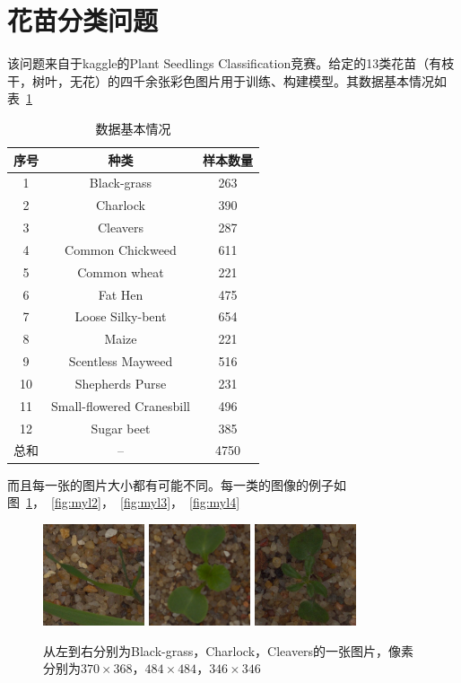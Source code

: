 \section{花苗分类问题}
该问题来自于kaggle的Plant Seedlings Classification竞赛。给定的13类花苗（有枝干，树叶，无花）的四千余张彩色图片用于训练、构建模型。其数据基本情况如表~\ref{table:sjjb}

\begin{table}[htbp]
\centering
\caption{数据基本情况}
\begin{tabular}{ccc}
\toprule[2pt]
序号 & 种类 & 样本数量 \\ 
\midrule[1pt]
1 & Black-grass & 263 \\ 
2 & Charlock & 390 \\ 
3 & Cleavers & 287 \\ 
4 & Common Chickweed & 611 \\ 
5 & Common wheat & 221 \\ 
6 & Fat Hen & 475 \\ 
7 & Loose Silky-bent & 654 \\ 
8 & Maize & 221 \\  
9 & Scentless Mayweed & 516 \\ 
10 & Shepherds Purse & 231 \\ 
11 & Small-flowered Cranesbill & 496 \\ 
12 & Sugar beet & 385 \\ 
\midrule[1pt]
总和 & -- & 4750\\
\bottomrule[2pt]
\end{tabular} 
\label{table:sjjb} 
\end{table}


而且每一张的图片大小都有可能不同。每一类的图像的例子如图~\ref{fig:myl1}，~\ref{fig:myl2}，~\ref{fig:myl3}，~\ref{fig:myl4}
\begin{figure}[htbp]
\centering
\includegraphics[width=30mm,height=30mm]{../figures/Black-grass_1af1eddd3.png} 
\includegraphics[width=30mm,height=30mm]{../figures/Charlock_0a7e1ca41.png} 	
\includegraphics[width=30mm,height=30mm]{../figures/Cleavers_0a1e622bc.png} 	
\caption{从左到右分别为Black-grass，Charlock，Cleavers的一张图片，像素分别为$370\times368$，$484\times484$，$346\times346$}
\label{fig:myl1}
\end{figure}

